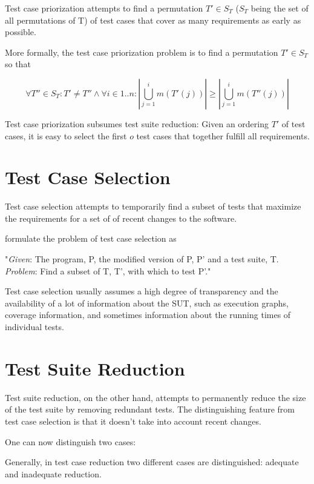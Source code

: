 Test case priorization attempts to find a permutation $T' \in S_{T}$
($S_{T}$ being the set of all permutations of T) of test cases that
cover as many requirements as early as possible.

More formally, the test case priorization problem is to find a permutation
$T' \in S_{T}$ so that

$$ \forall T'' \in S_{T}: T' \neq T'' \land \forall i \in 1..n: |\bigcup_{j=1}^{i} m(T'(j))| \geq |\bigcup_{j=1}^{i} m(T''(j))| $$


Test case priorization subsumes test suite reduction: Given an ordering
$T'$ of test cases, it is easy to select the first $o$ test cases that
together fulfill all requirements.

\section{Test Case Selection}

Test case selection attempts to temporarily find a subset of tests that
maximize the requirements for a set of of recent changes to the software.

\cite{yoo2012regression} formulate the problem of test case selection as

"\textit{Given}: The program, P, the modified version of P, P' and a test suite, T. \\
\textit{Problem}: Find a subset of T, T', with which to test P'."

Test case selection usually assumes a high degree of transparency and
the availability of a lot of information about the SUT, such as execution
graphs, coverage information, and sometimes information about the running
times of individual tests.

\section{Test Suite Reduction}

Test suite reduction, on the other hand, attempts to permanently reduce
the size of the test suite by removing redundant tests. The distinguishing
feature from test case selection is that it doesn't take into account
recent changes.

One can now distinguish two cases:


Generally, in test case reduction two different cases are distinguished:
adequate and inadequate reduction.

